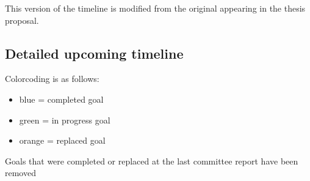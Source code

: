 \documentclass[11pt]{article}
\begin{document}
This version of the timeline is modified from the original appearing in the thesis proposal. 

\subsection*{Detailed upcoming timeline}
Colorcoding is as follows:
    
    \begin{itemize}
    	\item {\color{RoyalBlue}blue} = completed goal
    	\item {\color{ForestGreen} green} = in progress goal
    	\item {\color{BurntOrange} orange} = replaced goal
    \end{itemize}

Goals that were completed or replaced at the last committee report have been removed
\end{document}
